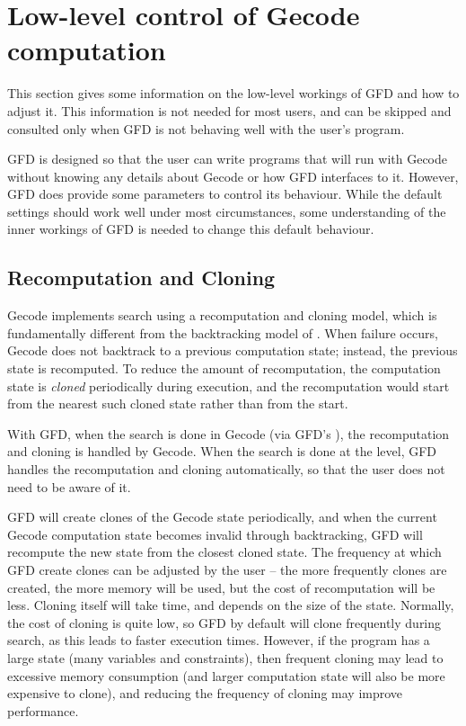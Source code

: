 \section{Low-level control of Gecode computation}
This section gives some information on the low-level workings of GFD and how
to adjust it. This information is not needed for most users, and can be 
skipped and consulted only when GFD is not behaving well with the user's
program.

GFD is designed so that the user can write programs that will run with
 Gecode without knowing any details about Gecode or how GFD interfaces
 to it. However, GFD does provide some parameters to control its behaviour.
While the default settings should work well under most circumstances, some
understanding of the inner workings of GFD is needed to change this default
behaviour. 

\subsection{Recomputation and Cloning}


Gecode implements search using a recomputation and cloning model,
which is fundamentally different from the backtracking model of \eclipse.
When failure occurs, Gecode does not backtrack to a previous computation
state; instead, the previous state is recomputed. To reduce the amount
of recomputation, the computation state is {\it cloned\/} periodically
during execution, and the recomputation would start from the nearest
such cloned state rather than from the start.

With GFD, when the search is done in Gecode (via GFD's 
), the
recomputation and cloning is handled by Gecode. When the search is done
at the {\eclipse} level, GFD handles the recomputation and cloning automatically,
so that the user does not need to be aware of it.

GFD will create clones of the Gecode state periodically, and when the
current Gecode computation state becomes invalid through {\eclipse} backtracking,
GFD will recompute the new state from the closest cloned state. 
The frequency at which GFD create clones can be adjusted by the user --
the more frequently clones are created, the more memory will be used, but
the cost of recomputation will be less. Cloning itself will take time,
and depends on the size of the state. Normally, the cost of cloning is
quite low, so GFD by default will clone frequently during search, as 
this leads to faster execution times. However, if the program has a large
state (many variables and constraints), then frequent cloning may lead to
excessive memory consumption (and larger computation state will also be 
more expensive to clone), and reducing the frequency of cloning may
improve performance.

